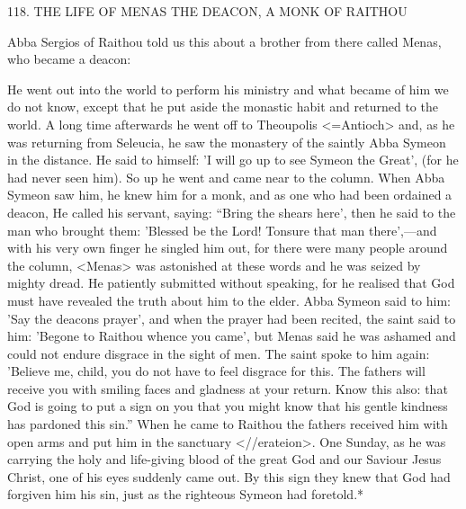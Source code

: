 118.
THE LIFE OF MENAS THE DEACON,
A MONK OF RAITHOU

Abba Sergios of Raithou told us this about a brother from there
called Menas, who became a deacon:

He went out into the world to perform his ministry and what
became of him we do not know, except that he put aside the
monastic habit and returned to the world.
A long time afterwards
he went off to Theoupolis <=Antioch> and, as he was returning
from Seleucia, he saw the monastery of the saintly Abba Symeon in
the distance.
He said to himself: 'I will go up to see Symeon the
Great', (for he had never seen him).
So up he went and came near
to the column.
When Abba Symeon saw him, he knew him for a
monk, and as one who had been ordained a deacon, He called his
servant, saying: “Bring the shears here', then he said to the man who
brought them: 'Blessed be the Lord! Tonsure that man there',—and
with his very own finger he singled him out, for there were many
people around the column, <Menas> was astonished at these words
and he was seized by mighty dread.
He patiently submitted without
speaking, for he realised that God must have revealed the truth
about him to the elder.
Abba Symeon said to him: 'Say the deacon\textquotesingle s
prayer', and when the prayer had been recited, the saint said to him:
'Begone to Raithou whence you came', but Menas said he was
ashamed and could not endure disgrace in the sight of men.
The
saint spoke to him again: 'Believe me, child, you do not have to feel
disgrace for this.
The fathers will receive you with smiling faces and
gladness at your return.
Know this also: that God is going to put a
sign on you that you might know that his gentle kindness has
pardoned this sin.” When he came to Raithou the fathers received
him with open arms and put him in the sanctuary <//erateion>.
One Sunday, as he was carrying the holy and life-giving blood of
the great God and our Saviour Jesus Christ, one of his eyes
suddenly came out.
By this sign they knew that God had forgiven
him his sin, just as the righteous Symeon had foretold.*

